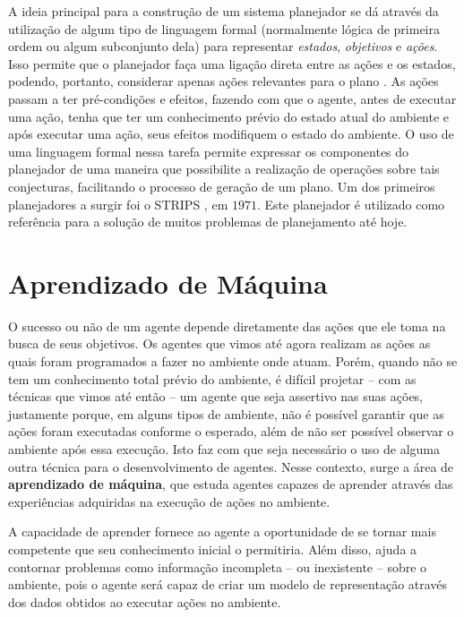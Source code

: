 A ideia principal para a construção de um sistema planejador se dá através da
utilização de algum tipo de linguagem formal (normalmente lógica de primeira
ordem ou algum subconjunto dela) para representar \textit{estados},
\textit{objetivos} e \textit{ações}. Isso permite que o planejador faça uma
ligação direta entre as ações e os estados, podendo, portanto, considerar
apenas ações relevantes para o plano \cite{Russell:1995:AIM:193191}. As ações
passam a ter pré-condições e efeitos, fazendo com que o agente, antes de
executar uma ação, tenha que ter um conhecimento prévio do estado atual do
ambiente e após executar uma ação, seus efeitos modifiquem o estado do
ambiente. O uso de uma linguagem formal nessa tarefa permite expressar os
componentes do planejador de uma maneira que possibilite a realização de
operações sobre tais conjecturas, facilitando o processo de geração de um
plano. Um dos primeiros planejadores a surgir foi o STRIPS
\cite{Fikes:1971:SNA:1622876.1622939}, em $1971$. Este planejador é utilizado
como referência para a solução de muitos problemas de planejamento até hoje.


\section{Aprendizado de Máquina}
O sucesso ou não de um agente depende diretamente das ações que ele toma na
busca de seus objetivos. Os agentes que vimos até agora realizam as ações as
quais foram programados a fazer no ambiente onde atuam. Porém, quando não se
tem um conhecimento total prévio do ambiente, é difícil projetar -- com as
técnicas que vimos até então -- um agente que seja assertivo nas suas ações,
justamente porque, em alguns tipos de ambiente, não é possível garantir que as
ações foram executadas conforme o esperado, além de não ser possível observar o
ambiente após essa execução. Isto faz com que seja necessário o uso de alguma
outra técnica para o desenvolvimento de agentes. Nesse contexto, surge a área
de \textbf{aprendizado de máquina}, que estuda agentes capazes de aprender
através das experiências adquiridas na execução de ações no ambiente.

A capacidade de aprender fornece ao agente a oportunidade de se tornar mais
competente que seu conhecimento inicial o permitiria.  Além disso, ajuda a
contornar problemas como informação incompleta -- ou inexistente -- sobre o
ambiente, pois o agente será capaz de criar um modelo de representação através
dos dados obtidos ao executar ações no ambiente. 

